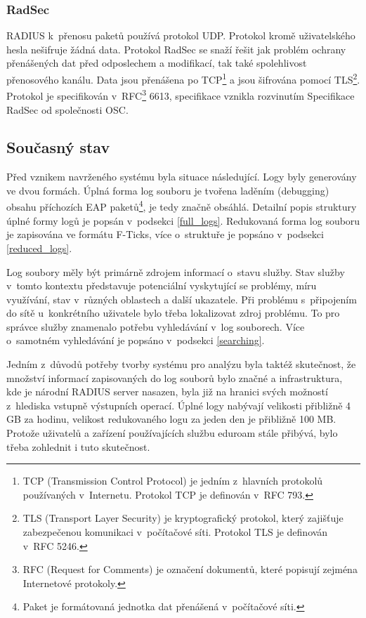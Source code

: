 \documentclass[thesis=M,czech]{FITthesis}[2012/06/26]
\begin{document}
  \subsubsection{RadSec}
    RADIUS k~přenosu paketů používá protokol UDP.
    Protokol kromě uživatelského hesla nešifruje žádná data. 
    Protokol RadSec se snaží řešit jak problém ochrany přenášených dat před odposlechem a modifikací, 
    tak také spolehlivost přenosového kanálu. 
    Data jsou přenášena po TCP\footnote{
      TCP (Transmission Control Protocol) je jedním z~hlavních protokolů používaných v~Internetu.
      Protokol TCP je definován v~RFC 793.
    }
    a jsou šifrována pomocí TLS\footnote{
      TLS (Transport Layer Security) je kryptografický protokol, který zajišťuje zabezpečenou komunikaci v~počítačové síti.
      Protokol TLS je definován v~RFC 5246.
    }. 
    Protokol je specifikován v~RFC\footnote{
      RFC (Request for Comments) je označení dokumentů, které popisují zejména Internetové protokoly.
    }
    6613, specifikace vznikla rozvinutím Specifikace RadSec od společnosti OSC.\cite{eduroam_radsec}

  \subsection{Současný stav}

    Před vznikem navrženého systému byla situace následující.
    Logy byly generovány ve dvou formách.
    Úplná forma log souboru je tvořena laděním (debugging) obsahu příchozích EAP paketů\footnote{
      Paket je formátovaná jednotka dat přenášená v~počítačové síti.
    }, 
    je tedy značně obsáhlá.
    Detailní popis struktury úplné formy logů je popsán v~podsekci \ref{full_logs}.
    Redukovaná forma log souboru je zapisována ve formátu F-Ticks, více o~struktuře
    je popsáno v~podsekci \ref{reduced_logs}.
    
    Log soubory měly být primárně zdrojem informací o~stavu služby.
    Stav služby v~tomto kontextu představuje potenciální vyskytující se problémy,
    míru využívání, stav v~různých oblastech a další ukazatele.
    Při problému s~připojením do sítě u~konkrétního uživatele 
    bylo třeba lokalizovat zdroj problému.
    To pro správce služby znamenalo potřebu vyhledávání v~log souborech.
    Více o~samotném vyhledávání je popsáno v~podsekci \ref{searching}.

    Jedním z~důvodů potřeby tvorby systému pro analýzu byla taktéž skutečnost, 
    že množství informací zapisovaných do log souborů bylo značné a infrastruktura,
    kde je národní RADIUS server nasazen, byla již na hranici svých možností z~hlediska
    vstupně výstupních operací.
    Úplné logy nabývají velikosti přibližně 4 GB za hodinu, velikost redukovaného logu za
    jeden den je přibližně 100 MB.
    Protože uživatelů a zařízení používajících službu eduroam stále přibývá, 
    bylo třeba zohlednit i tuto skutečnost.
\end{document}
